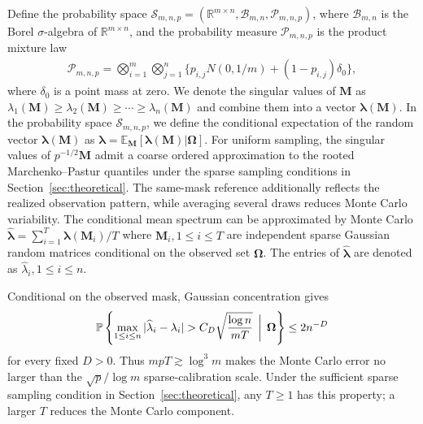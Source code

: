 \documentclass[numsec,webpdf,modern,large,namedate]{oup-authoring-template}
\theoremstyle{plain}
\theoremstyle{remark}
\newcommand{\M}{\bm{M}}
\newcommand{\bOmega}{\bm{\Omega}}
\newif\ifmarkchanges
\newenvironment{revision}{\begingroup\ifmarkchanges\color{red}\fi}{\endgroup}
\begin{document}
\begin{revision}
Define the probability space $\mathcal{S}_{m,n,p} = \left(\mathbb{R}^{m\times n},\mathcal{B}_{m,n},\mathcal{P}_{m,n,p}\right)$, where $\mathcal{B}_{m,n}$ is the Borel $\sigma$-algebra of $\mathbb{R}^{m\times n}$, and the probability measure $\mathcal{P}_{m,n,p}$ is the product mixture law
\begin{align*}
 \mathcal P_{m,n,p}
 =\bigotimes_{i=1}^{m}\bigotimes_{j=1}^{n}
 \{p_{i,j}N(0,1/m)+(1-p_{i,j})\delta_0\},
\end{align*}
where $\delta_0$ is a point mass at zero. 
We denote the singular values of $\M$ as $\lambda_{1}(\M)\ge \lambda_2(\M)\ge \cdots \ge \lambda_n(\M)$ and combine them into a vector $\bm{\lambda}(\M)$. 
  In the probability space $\mathcal{S}_{m,n,p}$, we define the conditional expectation of the random vector $\bm{\lambda}(\M)$ as
  $\bm{\lambda} = \mathbb{E}_{\M} [\bm{\lambda}(\M)|\bOmega]$. For uniform sampling, the singular values of $p^{-1/2}\M$ admit a coarse ordered approximation to the rooted Marchenko--Pastur quantiles under the sparse sampling conditions in Section~\ref{sec:theoretical}. The same-mask reference additionally reflects the realized observation pattern, while averaging several draws reduces Monte Carlo variability.  The conditional mean spectrum can be approximated by Monte Carlo $\widehat{\bm{\lambda}} = \sum_{i=1}^T \bm{\lambda}(\M_i)/T$ where $\M_i,1\le i\le T$ are independent sparse Gaussian random matrices conditional on the observed set $\bOmega$. The entries of $\widehat{\bm{\lambda}}$ are denoted as $\widehat{\lambda}_i,1\le i\le n$.

Conditional on the observed mask, Gaussian concentration gives
\begin{align}
 \mathbb P\left\{
 \max_{1\le i\le n}|\widehat\lambda_i-\lambda_i|
 > C_D\sqrt{\frac{\log n}{mT}}\,\biggm|\,\bOmega\right\}
 \le 2n^{-D}
 \label{eq:main_reference_mc_error}
\end{align}
for every fixed $D>0$. Thus $mpT\gtrsim\log^3m$ makes the Monte Carlo
error no larger than the $\sqrt p/\log m$ sparse-calibration scale.
Under the sufficient sparse sampling condition in Section~\ref{sec:theoretical},
any $T\ge1$ has this property; a larger $T$ reduces the Monte Carlo
component.

\end{revision}


  
\end{document}
